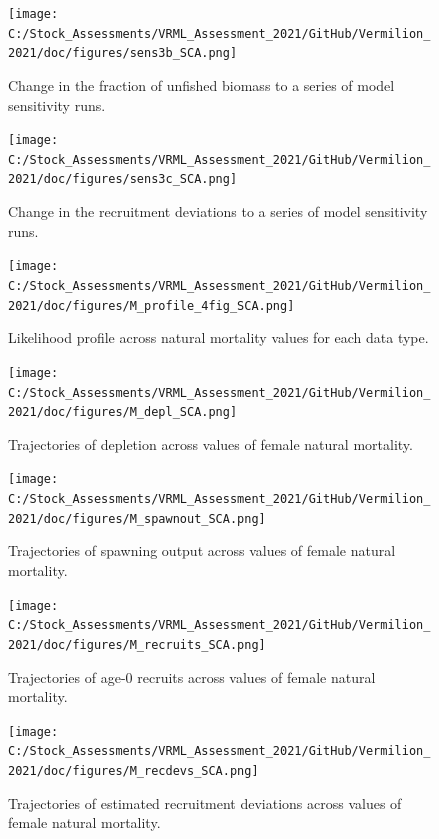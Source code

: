 \documentclass[11pt,
  english,
]{article}
\begin{document}
\begin{figure}
\centering
\texttt{[image: C:/Stock\_Assessments/VRML\_Assessment\_2021/GitHub/Vermilion\_2021/doc/figures/sens3b\_SCA.png]}
\caption{Change in the fraction of unfished biomass to a series of model sensitivity runs.\label{fig:sens3b}}
\end{figure}

\begin{figure}
\centering
\texttt{[image: C:/Stock\_Assessments/VRML\_Assessment\_2021/GitHub/Vermilion\_2021/doc/figures/sens3c\_SCA.png]}
\caption{Change in the recruitment deviations to a series of model sensitivity runs.\label{fig:sens3c}}
\end{figure}

\FloatBarrier

\begin{figure}
\centering
\texttt{[image: C:/Stock\_Assessments/VRML\_Assessment\_2021/GitHub/Vermilion\_2021/doc/figures/M\_profile\_4fig\_SCA.png]}
\caption{Likelihood profile across natural mortality values for each data type.\label{fig:m-profile}}
\end{figure}

\begin{figure}
\centering
\texttt{[image: C:/Stock\_Assessments/VRML\_Assessment\_2021/GitHub/Vermilion\_2021/doc/figures/M\_depl\_SCA.png]}
\caption{Trajectories of depletion across values of female natural mortality.\label{fig:m-depl}}
\end{figure}

\begin{figure}
\centering
\texttt{[image: C:/Stock\_Assessments/VRML\_Assessment\_2021/GitHub/Vermilion\_2021/doc/figures/M\_spawnout\_SCA.png]}
\caption{Trajectories of spawning output across values of female natural mortality.\label{fig:m-spawn}}
\end{figure}

\begin{figure}
\centering
\texttt{[image: C:/Stock\_Assessments/VRML\_Assessment\_2021/GitHub/Vermilion\_2021/doc/figures/M\_recruits\_SCA.png]}
\caption{Trajectories of age-0 recruits across values of female natural mortality.\label{fig:m-recruits}}
\end{figure}

\begin{figure}
\centering
\texttt{[image: C:/Stock\_Assessments/VRML\_Assessment\_2021/GitHub/Vermilion\_2021/doc/figures/M\_recdevs\_SCA.png]}
\caption{Trajectories of estimated recruitment deviations across values of female natural mortality.\label{fig:m-recdevs}}
\end{figure}
\end{document}
